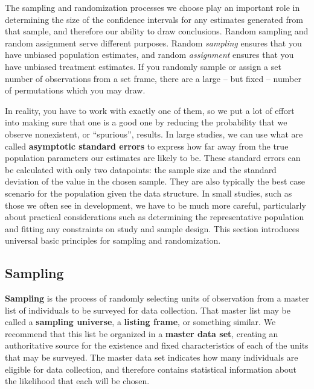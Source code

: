 The sampling and randomization processes we choose
play an important role in determining the size of the confidence intervals
for any estimates generated from that sample,
and therefore our ability to draw conclusions.
Random sampling and random assignment serve different purposes.
Random \textit{sampling} ensures that you have unbiased population estimates,
and random \textit{assignment} ensures that you have unbiased treatment estimates.
If you randomly sample or assign a set number of observations from a set frame,
there are a large -- but fixed -- number of permutations which you may draw.

In reality, you have to work with exactly one of them,
so we put a lot of effort into making sure that one is a good one
by reducing the probability that we observe nonexistent, or ``spurious'', results.
In large studies, we can use what are called \textbf{asymptotic standard errors}\cite{88491}
to express how far away from the true population parameters our estimates are likely to be.
These standard errors can be calculated with only two datapoints:
the sample size and the standard deviation of the value in the chosen sample.
They are also typically the best case scenario for the population given the data structure.
In small studies, such as those we often see in development,
we have to be much more careful, particularly about practical considerations
such as determining the representative population
and fitting any constraints on study and sample design.
This section introduces universal basic principles for sampling and randomization.

\subsection{Sampling}

\textbf{Sampling} is the process of randomly selecting units of observation
from a master list of individuals to be surveyed for data collection.
That master list may be called a \textbf{sampling universe}, a \textbf{listing frame}, or something similar.
We recommend that this list be organized in a \textbf{master data set},
creating an authoritative source for the existence and fixed
characteristics of each of the units that may be surveyed.
The master data set indicates how many individuals are eligible for data collection,
and therefore contains statistical information about the likelihood that each will be chosen.

